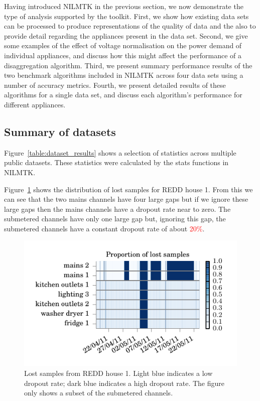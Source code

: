 \documentclass{sig-alternate}
\newcommand{\redcolor}[1]{\textcolor{red}{#1}}
\begin{document}
\noindent
Having introduced NILMTK in the previous section, we now demonstrate the type of analysis supported by the toolkit. First, we show how existing data sets can be processed to produce representations of the quality of data and the also to provide detail regarding the appliances present in the data set. Second, we give some examples of the effect of voltage normalisation on the power demand of individual appliances, and discuss how this might affect the performance of a disaggregation algorithm. Third, we present summary performance results of the two benchmark algorithms included in NILMTK across four data sets using a number of accuracy metrics. Fourth, we present detailed results of these algorithms for a single data set, and discuss each algorithm's performance for different appliances.

\subsection{Summary of datasets}

\noindent
Figure~\ref{table:dataset_results} shows a selection of statistics
across multiple public datasets.  These statistics were calculated by
the stats functions in NILMTK.  

Figure~\ref{fig:lost_samples} shows the distribution of lost samples for REDD house 1.  From this we can see that the two mains channels have four large gaps but if we ignore these large gaps then the mains channels have a dropout rate near to zero.  The submetered channels have only one large gap but, ignoring this gap, the submetered channels have a constant dropout rate of about \redcolor{20\%}.

\begin{figure}[!t]
  \centering
  \includegraphics[width=\columnwidth]{figures/lost_samples.pdf} 
  \caption{Lost samples from REDD house 1.  Light blue indicates a low
    dropout rate; dark blue indicates a high dropout rate.  The figure
    only shows a subset of the submetered channels.}
  \label{fig:lost_samples} 
\end{figure}
\end{document}
